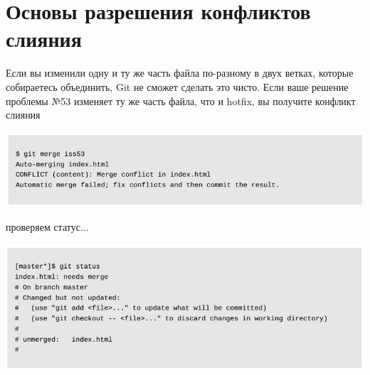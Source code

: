 \documentclass{beamer}
\begin{document}
\section{Основы разрешения конфликтов слияния}
\begin{frame}
Если вы изменили одну и ту же часть файла по-разному в двух ветках, которые собираетесь объединить, Git не сможет сделать это чисто. Если ваше решение проблемы №53 изменяет ту же часть файла, что и hotfix, вы получите
конфликт слияния 
\begin{center}
\includegraphics[scale=0.4]{images/conf-01.png}
\end{center}
\begin{block}{проверяем статус...}
\begin{center}
\includegraphics[scale=0.4]{images/conf-02.png}
\end{center}
\end{block}
\end{frame}
\end{document}
